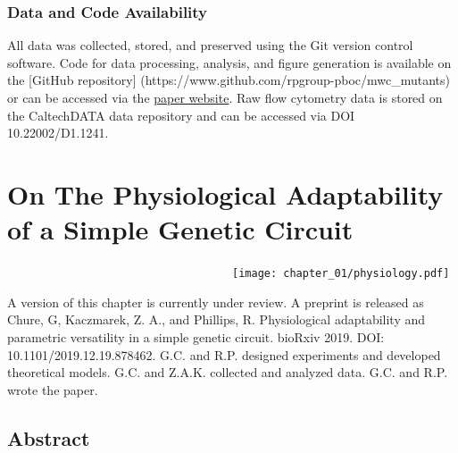 \documentclass[12pt]{caltech_thesis}
\begin{document}
\hypertarget{data-and-code-availability}{%
\subsection{Data and Code
Availability}\label{data-and-code-availability}}

All data was collected, stored, and preserved using the Git version
control software. Code for data processing, analysis, and figure
generation is available on the {[}GitHub repository{]}
(https://www.github.com/rpgroup-pboc/mwc\_mutants) or can be accessed
via the \href{http://www.rpgroup.caltech.edu/mwc_mutants}{paper
website}. Raw flow cytometry data is stored on the CaltechDATA data
repository and can be accessed via DOI 10.22002/D1.1241.

\hypertarget{on-the-physiological-adaptability-of-a-simple-genetic-circuit}{%
\chapter{On The Physiological Adaptability of a Simple Genetic
Circuit}\label{on-the-physiological-adaptability-of-a-simple-genetic-circuit}}

~~~~~~~~~~~~~~~~~~~~~~~~~~~~~~~~~~~~\texttt{[image: chapter\_01/physiology.pdf]}

A version of this chapter is currently under review. A preprint is
released as Chure, G, Kaczmarek, Z. A., and Phillips, R. Physiological
adaptability and parametric versatility in a simple genetic circuit.
bioRxiv 2019. DOI: 10.1101/2019.12.19.878462. G.C. and R.P. designed
experiments and developed theoretical models. G.C. and Z.A.K. collected
and analyzed data. G.C. and R.P. wrote the paper.

\hypertarget{abstract-2}{%
\section{Abstract}\label{abstract-2}}
\end{document}
